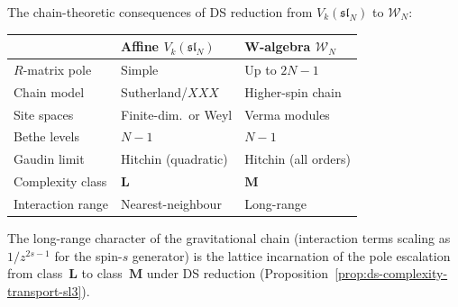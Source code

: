 \begin{remark}%
\label{rem:affine-vs-gravitational}%
%
The chain-theoretic consequences
of DS reduction from $V_k(\mathfrak{sl}_N)$ to
$\mathcal{W}_N$:
\begin{center}
\small
\renewcommand{\arraystretch}{1.3}
\begin{tabular}{lll}
\toprule
& \textbf{Affine}
 $V_k(\mathfrak{sl}_N)$
& \textbf{W-algebra}
 $\mathcal{W}_N$ \\
\midrule
$R$-matrix pole & Simple
 & Up to $2N - 1$ \\
Chain model & Sutherland/$XXX$
 & Higher-spin chain \\
Site spaces & Finite-dim.\ or Weyl
 & Verma modules \\
Bethe levels & $N - 1$
 & $N - 1$ \\
Gaudin limit & Hitchin (quadratic)
 & Hitchin (all orders) \\
Complexity class & $\mathbf{L}$
 & $\mathbf{M}$ \\
Interaction range & Nearest-neighbour
 & Long-range \\
\bottomrule
\end{tabular}
\end{center}
\noindent
The long-range character of the gravitational chain
(interaction terms scaling as $1/z^{2s-1}$ for the
spin-$s$ generator) is the lattice incarnation of the
pole escalation from class~$\mathbf{L}$ to class~$\mathbf{M}$
under DS reduction
(Proposition~\ref{prop:ds-complexity-transport-sl3}).
\end{remark}

